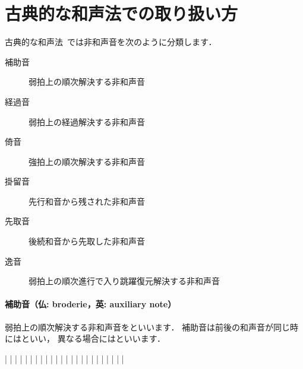 \documentclass[dvipdfmx,uplatex,b5paper,openany,jbase=12Q,nomag*,textwidth-limit=44%
               ]{gachimuchi}[2020/05/05]
\begin{document}
\section{古典的な和声法での取り扱い方}
古典的な和声法~\cite{chSHIMOFUSA1,chSHIMOFUSA2,mgKIKUCHI1}では非和声音を次のように分類します．
\begin{description}
  \item[補助音] 弱拍上の順次解決する非和声音
  \item[経過音] 弱拍上の経過解決する非和声音
  \item[倚音]   強拍上の順次解決する非和声音
  \item[掛留音] 先行和音から残された非和声音
  \item[先取音] 後続和音から先取した非和声音
  \item[逸音]   弱拍上の順次進行で入り跳躍復元解決する非和声音
\end{description}
\paragraph{補助音（仏: broderie，英: auxiliary note）}
弱拍上の順次解決する非和声音をといいます．
補助音は前後の和声音が同じ時にはといい，
異なる場合にはといいます．

\begin{Music}
  \generalmeter{\meterC}%
  \Startpiece%
  \NOtes%
  |\zchordsu{\Cross}%
  \en\NOTes%
  |%
  \en\doublebar%
  \NOtes%
  |\zchordsu{\Cross}%
  \en\NOTes%
  |%
  \en\doublebar%
  \NOtes%
  |\zchordsu{\Cross}%
  \en\NOTes%
  |%
  \en\doublebar%
  \NOtes%
  |\zchordsu{\Cross}%
  \en\NOTes%
  |%
  \en\doublebar%
  \NOtes%
  |\zchordsu{\Cross}%
  \en\NOTes%
  |%
  \en\doublebar%
  \NOtes%
  |\zchordsu{\Cross}%
  \en\NOTes%
  |%
  \en\setdoublebar%
  \endpiece%
  \generalmeter{\meterC}%
  \Startpiece%
  \NOtes%
  |\zchordsu{\Cross}%
  \en\NOTes%
  |%
  \en\doublebar%
  \NOtes%
  |\zchordsu{\Cross}%
  \en\NOTes%
  |%
  \en\doublebar%
  \NOtes%
  |\zchordsu{\Cross}%
  \en\NOTes%
  |%
  \en\doublebar%
  \NOtes%
  |\zchordsu{\Cross}%
  \en\NOTes%
  |%
  \en\doublebar%
  \NOtes%
  |\zchordsu{\Cross}%
  \en\NOTes%
  |%
  \en\doublebar%
  \NOtes%
  |\zchordsu{\Cross}%
  \en\NOTes%
  |%
  \en\setdoublebar%
  \endpiece%
\end{Music}
\end{document}
